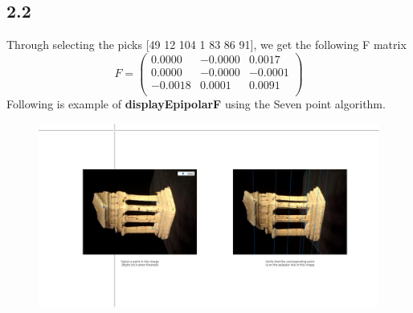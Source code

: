 \documentclass{article}
\begin{document}
\subsection*{2.2}
Through selecting the picks [49 12 104 1 83 86 91], we get the following F matrix 
\begin{equation*}
F = 
\begin{pmatrix}
    0.0000 & -0.0000  &  0.0017\\
    0.0000 & -0.0000  & -0.0001\\
   -0.0018 &  0.0001  &  0.0091\\
\end{pmatrix}
\end{equation*}
Following is example of \textbf{displayEpipolarF} using the Seven point algorithm.
\begin{figure}[H]
    \centering
    \includegraphics[width=6.5in]{./figures/q2_2}
\end{figure}
\end{document}
